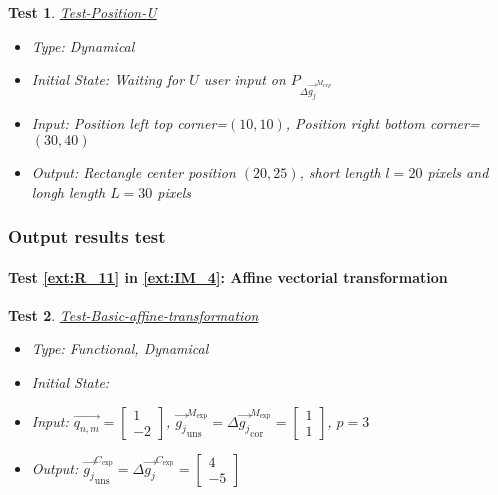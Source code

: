\documentclass[12pt, titlepage]{article}
\newtheorem{Test}{Test}
\begin{document}
\begin{Test}\normalfont\underline{Test-Position-U}
\begin{itemize}
\item Type: Dynamical
\item Initial State: Waiting for $U$ user input on $P_{\Delta \overrightarrow{g_{j}}^{M_{exp}}}$
\item Input: Position left top corner=$(10,10)$, Position right bottom corner=$(30,40)$
\item Output: Rectangle center position $(20,25)$, short length $l=20$ pixels and longh length $L=30$ pixels
\end{itemize}
\end{Test}


\subsubsection{Output results test}

\paragraph{Test \cref{ext:R_11} in \cref{ext:IM_4}: Affine vectorial transformation}

\begin{Test}\normalfont\underline{Test-Basic-affine-transformation}
\begin{itemize}
\item Type: Functional, Dynamical
\item Initial State: 
\item Input: $\overrightarrow{q_{n,m}}=\begin{bmatrix}
1 \\
-2
\end{bmatrix}$, $\overrightarrow{g_{j}}_{\text{uns}}^{M_{\text{exp}}}=\Delta\overrightarrow{g_{j}}_{\text{cor}}^{M_{\text{exp}}}=\begin{bmatrix}
1 \\
1
\end{bmatrix}$, $p=3$
\item Output:  $\overrightarrow{g_{j}}_{\text{uns}}^{C_{\text{exp}}}=\Delta\overrightarrow{g_{j}}^{C_{\text{exp}}}=\begin{bmatrix}
4\\
-5
\end{bmatrix}$
\end{itemize}
\end{Test}
\end{document}
